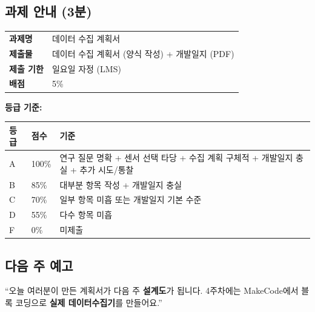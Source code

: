 \documentclass[11pt, a4paper]{article}
\begin{document}
\subsection{과제 안내 (3분)}

\begin{bluebox}[과제]
\begin{tabularx}{\textwidth}{L{3cm}X}
\textbf{과제명} & 데이터 수집 계획서 \\
\textbf{제출물} & 데이터 수집 계획서 (양식 작성) + 개발일지 (PDF) \\
\textbf{제출 기한} & 일요일 자정 (LMS) \\
\textbf{배점} & 5\% \\
\end{tabularx}
\end{bluebox}

\vspace{2mm}
\textbf{등급 기준:}

\begin{center}
\begin{tabularx}{0.92\textwidth}{C{0.8cm}C{1cm}X}
\toprule
\textbf{등급} & \textbf{점수} & \textbf{기준} \\
\midrule
A & 100\% & 연구 질문 명확 + 센서 선택 타당 + 수집 계획 구체적 + 개발일지 충실 + 추가 시도/통찰 \\
B & 85\% & 대부분 항목 작성 + 개발일지 충실 \\
C & 70\% & 일부 항목 미흡 또는 개발일지 기본 수준 \\
D & 55\% & 다수 항목 미흡 \\
F & 0\% & 미제출 \\
\bottomrule
\end{tabularx}
\end{center}

\subsection{다음 주 예고}

\begin{tipbox}[교수자 멘트]
``오늘 여러분이 만든 계획서가 다음 주 \textbf{설계도}가 됩니다. 4주차에는 MakeCode에서 블록 코딩으로 \textbf{실제 데이터수집기}를 만들어요.''
\end{tipbox}
\end{document}
